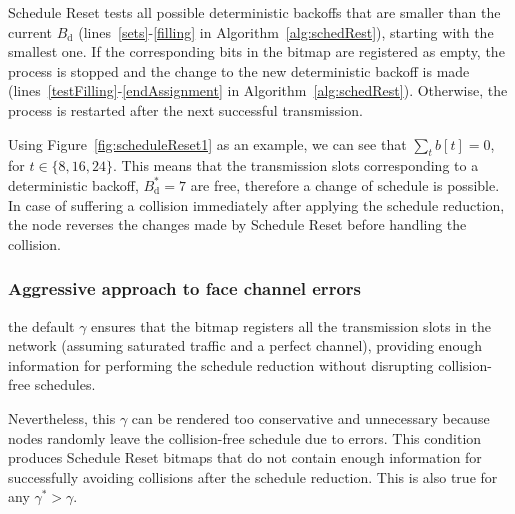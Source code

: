 		
		
		Schedule Reset tests all possible deterministic backoffs that are smaller than the current $B_{\text{d}}$ (lines~\ref{sets}-\ref{filling} in Algorithm~\ref{alg:schedRest}), starting with the smallest one. If the corresponding bits in the bitmap are registered as empty, the process is stopped and the change to the new deterministic backoff is made (lines~\ref{testFilling}-\ref{endAssignment} in Algorithm~\ref{alg:schedRest}). Otherwise, the process is restarted after the next successful transmission.
		
		Using Figure~\ref{fig:scheduleReset1} as an example, we can see that $\sum\limits_{t} b[t]=0$, for $t\in\{8,16,24\}$. This means that the transmission slots corresponding to a deterministic backoff, $B^{*}_{\text{d}}=7$ are free, therefore a change of schedule is possible. In case of suffering a collision immediately after applying the schedule reduction, the node reverses the changes made by Schedule Reset before handling the collision.
		
	
		\subsubsection{Aggressive approach to face channel errors}\label{aggr}
		
		the default $\gamma$ ensures that the bitmap registers all the transmission slots in the network (assuming saturated traffic and a perfect channel), providing enough information for performing the schedule reduction without disrupting collision-free schedules. 
		
		Nevertheless, this $\gamma$ can be rendered too conservative and unnecessary because nodes randomly leave the collision-free schedule due to errors. This condition produces Schedule Reset bitmaps that do not contain enough information for successfully avoiding collisions after the schedule reduction. This is also true for any $\gamma^{*}>\gamma$.
		
